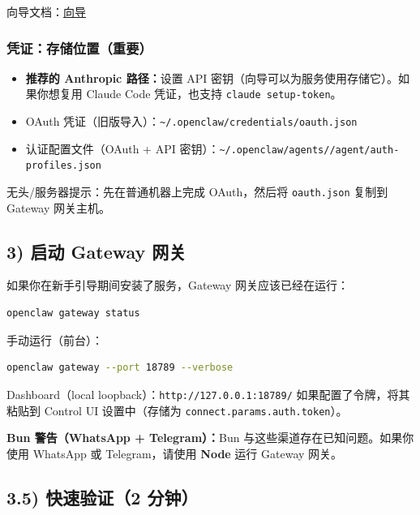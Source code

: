 向导文档：\href{/start/wizard}{向导}

\subsubsection{凭证：存储位置（重要）}


\begin{itemize}
  \item \textbf{推荐的 Anthropic 路径：}设置 API 密钥（向导可以为服务使用存储它）。如果你想复用 Claude Code 凭证，也支持 \texttt{claude setup-token}。
\end{itemize}


\begin{itemize}
  \item OAuth 凭证（旧版导入）：\texttt{\textasciitilde{}/.openclaw/credentials/oauth.json}
  \item 认证配置文件（OAuth + API 密钥）：\texttt{\textasciitilde{}/.openclaw/agents//agent/auth-profiles.json}
\end{itemize}


无头/服务器提示：先在普通机器上完成 OAuth，然后将 \texttt{oauth.json} 复制到 Gateway 网关主机。

\subsection{3) 启动 Gateway 网关}


如果你在新手引导期间安装了服务，Gateway 网关应该已经在运行：

\begin{lstlisting}[language=bash]
openclaw gateway status
\end{lstlisting}


手动运行（前台）：

\begin{lstlisting}[language=bash]
openclaw gateway --port 18789 --verbose
\end{lstlisting}


Dashboard（local loopback）：\texttt{http://127.0.0.1:18789/}
如果配置了令牌，将其粘贴到 Control UI 设置中（存储为 \texttt{connect.params.auth.token}）。

 \textbf{Bun 警告（WhatsApp + Telegram）：}Bun 与这些渠道存在已知问题。如果你使用 WhatsApp 或 Telegram，请使用 \textbf{Node} 运行 Gateway 网关。

\subsection{3.5) 快速验证（2 分钟）}


